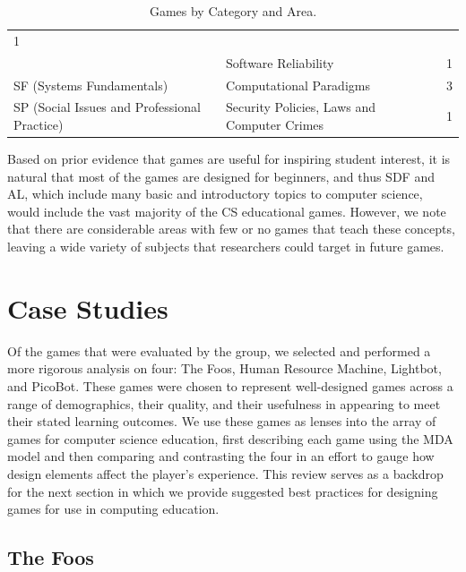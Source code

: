 \documentclass{sig-alternate-05-2015}
\begin{document}
\begin{table}[tb]
\begin{tabularx}{\linewidth}{|X|X|r|}
1\\ \cline{2-3}
&


Software Reliability&


1\\ \hline


SF (Systems Fundamentals)&


Computational Paradigms&


3\\ \hline


SP (Social Issues and Professional Practice)&


Security Policies, Laws and Computer Crimes&


1\\ \hline
\end{tabularx}
\caption{Games by Category and Area.}
\label{table:categoryandarea}
\end{table}




Based on prior evidence that games are useful for inspiring student interest, it is natural that most of the games are designed for beginners, and thus SDF and AL, which include many basic and introductory topics to computer science, would include the vast majority of the CS educational games. However, we note that there are considerable areas with few or no games that teach these concepts, leaving a wide variety of subjects that researchers could target in future games.\section{Case Studies}


Of the games that were evaluated by the group, we selected and performed a more rigorous analysis on four: The Foos, Human Resource Machine, Lightbot, and PicoBot. These games were chosen to represent well-designed games across a range of demographics, their quality, and their usefulness in appearing to meet their stated learning outcomes. We use these games as lenses into the array of games for computer science education, first describing each game using the MDA model and then comparing and contrasting the four in an effort to gauge how design elements affect the player's experience. This review serves as a backdrop for the next section in which we provide suggested best practices for designing games for use in computing education.\subsection{The Foos}
\end{document}
